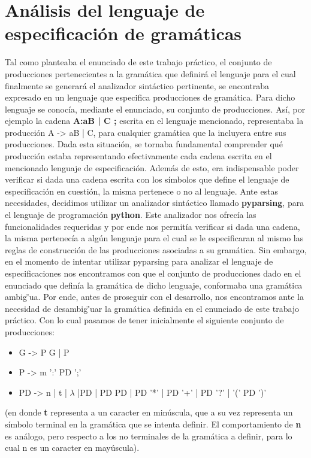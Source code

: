 \documentclass[a4paper]{report}
\begin{document}
\section*{An\'alisis del lenguaje de especificaci\'on de gram\'aticas}
Tal como planteaba el enunciado de este trabajo pr\'actico, el conjunto de producciones pertenecientes a la gram\'atica que definir\'a el lenguaje para el cual finalmente se generar\'a el 
analizador sint\'actico pertinente, se encontraba expresado en un lenguaje que especifica producciones de gram\'atica. Para dicho lenguaje se conoc\'ia, mediante el enunciado, su conjunto de producciones. As\'i, por ejemplo la cadena \textbf{ A:aB | C ; } escrita en el lenguaje mencionado, representaba la producci\'on A -> aB | C, para cualquier gram\'atica que la incluyera entre sus producciones.
Dada esta situaci\'on, se tornaba fundamental comprender qu\'e producci\'on estaba representando efectivamente cada cadena escrita en el mencionado lenguaje de especificaci\'on. Adem\'as de esto, era indispensable poder verificar si dada una cadena escrita con los s\'imbolos que define el lenguaje de especificaci\'on en cuesti\'on, la misma pertenece o no al lenguaje.
Ante estas necesidades, decidimos utilizar un analizador sint\'actico llamado \textbf{pyparsing}, para el lenguaje de programaci\'on \textbf{python}. Este analizador nos ofrec\'ia las funcionalidades requeridas y por ende nos permit\'ia verificar si dada una cadena, la misma pertenec\'ia a alg\'un lenguaje para el cual se le especificaran al mismo las reglas de construcci\'on de las producciones asociadas a su gram\'atica.
Sin embargo, en el momento de intentar utilizar pyparsing para analizar el lenguaje de especificaciones nos encontramos con que el conjunto de producciones dado en el enunciado que defin\'ia la gram\'atica de dicho lenguaje, conformaba una gram\'atica ambig\"'ua. Por ende, antes de proseguir con el desarrollo, nos encontramos ante la necesidad de desambig\"'uar la gram\'atica definida en el enunciado de este trabajo pr\'actico. Con lo cual pasamos de tener inicialmente el siguiente conjunto de producciones:

\begin{itemize}
	\item G  -> P G | P
	\item P  -> m ':'  PD ';'
	\item PD -> n | t | $\lambda$ |PD | PD PD | PD '*' | PD '+' | PD '?'  | '(' PD ')'
\end{itemize}

(en donde \textbf{t} representa a un caracter en min\'uscula, que a su vez representa un s\'imbolo terminal en la gram\'atica que se intenta definir. El comportamiento de \textbf{n} es an\'alogo, pero respecto a los no terminales de la gram\'atica a definir, para lo cual n es un caracter en may\'uscula).
\end{document}

